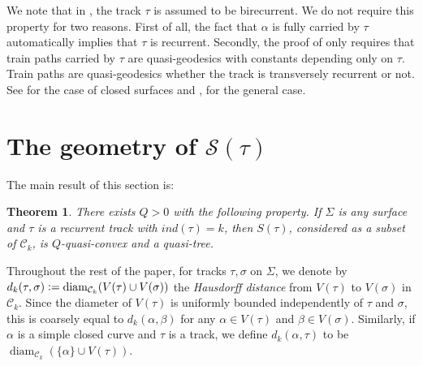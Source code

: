 \documentclass[11pt]{article}
\newtheorem{thm}{Theorem}[section]
\theoremstyle{remark}
\def\S{{\mathcal S}}
\def\diam{\operatorname{diam}}
\def\C{{\mathcal C}}
\begin{document}
We note that in \cite[Lemma 4.4]{MM}, the track $\tau$ is assumed to be birecurrent.
We do not require this property for two reasons. First of all, the fact that $\alpha$
is fully carried by $\tau$ automatically implies that $\tau$ is recurrent. Secondly,
the proof of \cite[Lemma 4.4]{MM} only requires that train paths carried by $\tau$
are quasi-geodesics with constants depending only on $\tau$. Train paths are
quasi-geodesics
whether the track is transversely recurrent or not. See \cite[Lemma 5.8]{casson}
for the case of closed surfaces and \cite{Bonahon},
\cite[Lemma 20]{BZ} for the general case.

\section{The geometry of $\S(\tau)$}

The main result of this section is:

\begin{thm}\label{qtree}
  There exists $Q>0$ with the following property. If $\Sigma$ is any surface
  and $\tau$ is a recurrent track with $ind(\tau)=k$,
  then $S(\tau)$, considered as a subset of $\C_k$, is $Q$-quasi-convex and a
  quasi-tree.
\end{thm}

Throughout the rest of the paper,
for tracks $\tau,\sigma$ on $\Sigma$, we denote by
$d_k(\tau,\sigma)\vcentcolon=\mathrm{diam}_{\C_k}(V(\tau)\cup V(\sigma))$
the \emph{Hausdorff distance} from
$V(\tau)$ to $V(\sigma)$ in $\C_k$. Since the diameter of $V(\tau)$ is uniformly
bounded independently of $\tau$ and $\sigma$, this is coarsely equal to
$d_k(\alpha,\beta)$ for any $\alpha\in V(\tau)$ and $\beta\in V(\sigma)$. Similarly,
if $\alpha$ is a simple closed curve and $\tau$ is a track, we define
$d_k(\alpha,\tau)$ to be $\diam_{\C_k}(\{\alpha\}\cup V(\tau))$.
\end{document}
